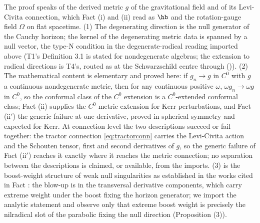 The proof speaks of the derived metric $g$ of the gravitational field and of its Levi-Civita connection, which Fact (i) and (ii) read as $\hb$ and the rotation-gauge field $\Omega$ on flat spacetime. (1) The degenerating direction is the null generator of the Cauchy horizon; the kernel of the degenerating metric data is spanned by a null vector, the type-N condition in the degenerate-radical reading imported above (T1's Definition 3.1 is stated for nondegenerate algebras; the extension to radical directions is T4's, routed as at the Schwarzschild centre through \cite[Prop.~3.1]{ButlerT5} ()). (2) The mathematical content is elementary and proved here: if $g_n \to g$ in $C^0$ with $g$ a continuous nondegenerate metric, then for any continuous positive $\omega$, $\omega g_n \to \omega g$ in $C^0$, so the conformal class of the $C^0$ extension is a $C^0$-extended conformal class; Fact (ii) supplies the $C^0$ metric extension for Kerr perturbations, and Fact (ii$'$) the generic failure at one derivative, proved in spherical symmetry and expected for Kerr. At connection level the two descriptions succeed or fail together: the tractor connection \eqref{eq:tractorconn} carries the Levi-Civita action and the Schouten tensor, first and second derivatives of $g$, so the generic failure of Fact (ii$'$) reaches it exactly where it reaches the metric connection; no separation between the descriptions is claimed, or available, from the imports. (3) is the boost-weight structure of weak null singularities as established in the works cited in Fact : the blow-up is in the transversal derivative components, which carry extreme weight under the boost fixing the horizon generator; we import the analytic statement and observe only that extreme boost weight is precisely the nilradical slot of the parabolic fixing the null direction (Proposition (3)).

